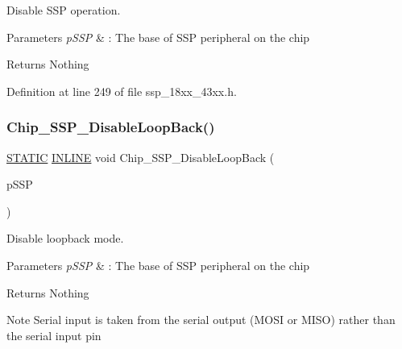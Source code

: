 Disable S\+SP operation. 


\begin{DoxyParams}{Parameters}
{\em p\+S\+SP} & \+: The base of S\+SP peripheral on the chip \\
\hline
\end{DoxyParams}
\begin{DoxyReturn}{Returns}
Nothing 
\end{DoxyReturn}


Definition at line 249 of file ssp\+\_\+18xx\+\_\+43xx.\+h.

\mbox{\label{group___s_s_p__18_x_x__43_x_x_gaa733ed4b0773cda022ad87ff41304c40}} 
\subsubsection{\texorpdfstring{Chip\+\_\+\+S\+S\+P\+\_\+\+Disable\+Loop\+Back()}{Chip\_SSP\_DisableLoopBack()}}
{\footnotesize\ttfamily \hyperlink{group___l_p_c___types___public___macros_ga10b2d890d871e1489bb02b7e70d9bdfb}{S\+T\+A\+T\+IC} \hyperlink{spifi__18xx__43xx_8h_a2eb6f9e0395b47b8d5e3eeae4fe0c116}{I\+N\+L\+I\+NE} void Chip\+\_\+\+S\+S\+P\+\_\+\+Disable\+Loop\+Back (\begin{DoxyParamCaption}\item[{\hyperlink{struct_l_p_c___s_s_p___t}{L\+P\+C\+\_\+\+S\+S\+P\+\_\+T} $\ast$}]{p\+S\+SP }\end{DoxyParamCaption})}



Disable loopback mode. 


\begin{DoxyParams}{Parameters}
{\em p\+S\+SP} & \+: The base of S\+SP peripheral on the chip \\
\hline
\end{DoxyParams}
\begin{DoxyReturn}{Returns}
Nothing 
\end{DoxyReturn}
\begin{DoxyNote}{Note}
Serial input is taken from the serial output (M\+O\+SI or M\+I\+SO) rather than the serial input pin 
\end{DoxyNote}


